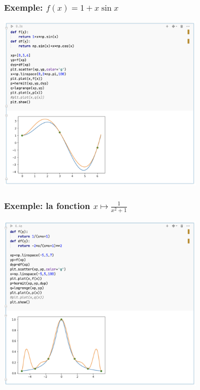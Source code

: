 \documentclass{beamer}
\begin{document}
\begin{frame}
 \frametitle{Exemple: $f(x)=1+x\sin x$}
\begin{center}
\includegraphics[width=10cm]{images/interpolationDHermite01.png}
\end{center}
\end{frame}

%
%
%
% 


\begin{frame}
 \frametitle{Exemple: la fonction  $x\mapsto \frac 1{x^2+1}$}
\begin{center}
\includegraphics[width=10cm]{images/interpolationDHermite02.png}
\end{center}
\end{frame}
\end{document}
